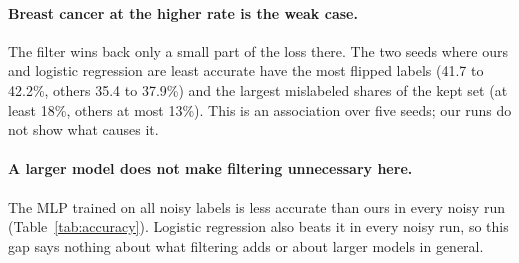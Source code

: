 \paragraph{Breast cancer at the higher rate is the weak case.}
The filter wins back only a small part of the loss there. The two seeds where ours and logistic regression are least accurate have the most flipped labels (41.7 to 42.2\%, others 35.4 to 37.9\%) and the largest mislabeled shares of the kept set (at least 18\%, others at most 13\%). This is an association over five seeds; our runs do not show what causes it.

\paragraph{A larger model does not make filtering unnecessary here.}
The MLP trained on all noisy labels is less accurate than ours in every noisy run (Table~\ref{tab:accuracy}). Logistic regression also beats it in every noisy run, so this gap says nothing about what filtering adds or about larger models in general.
